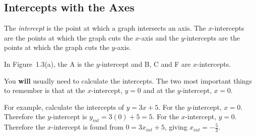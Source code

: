             \subsection{ Intercepts with the Axes}
            \nopagebreak
        \label{m39337*id236308}The \textsl{intercept} is the point at which a graph intersects an axis. The $x$-intercepts are the points at which the graph cuts the $x$-axis and the $y$-intercepts are the points at which the graph cuts the $y$-axis.\par 
        \label{m39337*id236356}In Figure~1.3(a), the A is the $y$-intercept and B, C and F are $x$-intercepts.\par 
        \label{m39337*id236384}You \textbf{will} usually need to calculate the intercepts. The two most important things to remember is that at the $x$-intercept, $y=0$ and at the $y$-intercept, $x=0$.\par 
        \label{m39337*id236442}For example, calculate the intercepts of $y=3x+5$. For the $y$-intercept, $x=0$. Therefore the $y$-intercept is ${y}_{int}=3\left(0\right)+5=5$. For the $x$-intercept, $y=0$. Therefore the $x$-intercept is found from $0=3{x}_{int}+5$, giving ${x}_{int}=-\frac{5}{3}$.\par 
      \label{m39337*uid47}
